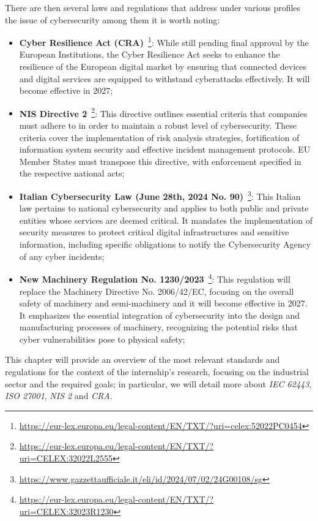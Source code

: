 There are then several laws and regulations that address under various profiles the issue of cybersecurity among them it is worth noting:~\cite{cybersecurity-standards-regulations-compliance}
\begin{itemize}
  \item \textbf{Cyber Resilience Act (CRA)}~\footnote{\url{https://eur-lex.europa.eu/legal-content/EN/TXT/?uri=celex:52022PC0454}}: While still pending final approval by the European Institutions, the Cyber Resilience Act seeks to enhance the resilience of the European digital market by ensuring that connected devices and digital services are equipped to withstand cyberattacks effectively. It will become effective in 2027;
  \item  \textbf{NIS Directive 2}~\footnote{\url{https://eur-lex.europa.eu/legal-content/EN/TXT/?uri=CELEX:32022L2555}}: This directive outlines essential criteria that companies must adhere to in order to maintain a robust level of cybersecurity. These criteria cover the implementation of risk analysis strategies, fortification of information system security and effective incident management protocols. EU Member States must transpose this directive, with enforcement specified in the respective national acts;
  \item \textbf{Italian Cybersecurity Law (June 28th, 2024 No. 90)}~\footnote{\url{https://www.gazzettaufficiale.it/eli/id/2024/07/02/24G00108/sg}}: This Italian law pertains to national cybersecurity and applies to both public and private entities whose services are deemed critical. It mandates the implementation of security measures to protect critical digital infrastructures and sensitive information, including specific obligations to notify the Cybersecurity Agency of any cyber incidents;
  \item \textbf{New Machinery Regulation No. 1230/2023}~\footnote{\url{https://eur-lex.europa.eu/legal-content/EN/TXT/?uri=CELEX:32023R1230}}: This regulation will replace the Machinery Directive No. 2006/42/EC, focusing on the overall safety of machinery and semi-machinery and it will become effective in 2027. It emphasizes the essential integration of cybersecurity into the design and manufacturing processes of machinery, recognizing the potential risks that cyber vulnerabilities pose to physical safety;
\end{itemize}

This chapter will provide an overview of the most relevant standards and regulations for the context of the internship's research, focusing on the industrial sector and the required goals; in particular, we will detail more about \textit{IEC 62443}, \textit{ISO 27001}, \textit{NIS 2} and \textit{CRA}.

